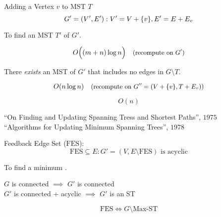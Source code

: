 
\begin{frame}{}
  \centerline{}
\end{frame}

\begin{frame}{}
  \begin{exampleblock}{Adding a Vertex $v$ to MST $T$ }
    \[
      G' = (V',E'): V' = V + \{v\}, E' = E + E_v
    \]

    \centerline{To find an MST $T'$ of $G'$.}
  \end{exampleblock}

  \pause
  \[
    O\Big((m+n) \log n\Big) \quad \text{\small (recompute on $G'$)}
  \]

  \pause
  \begin{theorem}
    \centerline{There \emph{exists} an MST of $G'$ that includes no edges in $G \setminus T$.}
  \end{theorem}
  \pause
  \[
    O(n \log n) \quad \text{\small (recompute on $G'' = (V + \{v\}, T + E_v)$)}
  \]


  \pause
  \[
    O(n)
  \]

  \pause
  \vspace{-0.30cm}
  \begin{center}
    {\small
      ``On Finding and Updating Spanning Tress and Shortest Paths'', $1975$ \\
      ``Algorithms for Updating Minimum Spanning Trees'', $1978$
    }
  \end{center}
\end{frame}

\begin{frame}{}
  \begin{exampleblock}{Feedback Edge Set ($\text{FES}$): }
    \[
      \text{FES} \subseteq E: G' = (V, E \setminus \text{FES}) \text{ is acyclic}
    \]

    \centerline{To find a minimum .}
  \end{exampleblock}

  \pause
  \vspace{0.50cm}
  \begin{center}
    $G$ is connected $\implies$ $G'$ is connected \\[8pt]
    $G'$ is connected + acyclic $\implies$ $G'$ is an ST \\[8pt]
  \end{center}

  \pause
  \[
    \text{FES} \iff G \setminus \text{Max-ST}
  \]
\end{frame}

